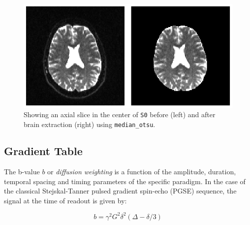 \documentclass{bioinfo}
\begin{document}
\begin{figure}
\includegraphics[scale=0.65]{Figures/median_otsu.eps}
\centering{}
\caption{Showing an axial slice in the center of \texttt{S0} before (left) and after brain extraction (right) using \texttt{median\_otsu}. \label{Fig:brain_segmentation}}
\end{figure}

\subsection{Gradient Table}\label{gtab}
The b-value $b$ or \emph{diffusion weighting} is a function of the amplitude,
duration, temporal spacing and timing parameters of the specific paradigm. In
the case of the classical Stejskal-Tanner pulsed gradient spin-echo (PGSE)
sequence, the signal at the time of readout is given by:

\begin{equation}
b=\gamma^{2}G^{2}\delta^{2}\left(\Delta-\delta/3 \right)\label{eq:stejskal}
\end{equation}
\end{document}
